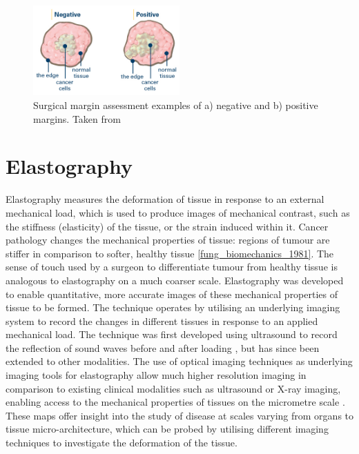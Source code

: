 \begin{figure}[t]
	\centering
    \includegraphics[width=0.5\textwidth]{bground_figs/margins.png}
    \caption{Surgical margin assessment examples of a) negative and b) positive margins. Taken from \cite{breastcancer.org_surgical_2017}}
	    \label{margins}
\end{figure}

\section{Elastography}\label{elastography}
Elastography measures the deformation of tissue in response to an external mechanical load, which is used to produce images of mechanical contrast, such as the stiffness (elasticity) of the tissue, or the strain induced within it. Cancer pathology changes the mechanical properties of tissue: regions of tumour are stiffer in comparison to softer, healthy tissue \ref{fung_biomechanics_1981}. The sense of touch used by a surgeon to differentiate tumour from healthy tissue is analogous to elastography on a much coarser scale. 
Elastography was developed to enable quantitative, more accurate images of these mechanical properties of tissue to be formed. The technique operates by utilising an underlying imaging system to record the changes in different tissues in response to an applied mechanical load. The technique was first developed using ultrasound to record the reflection of sound waves before and after loading \cite{ophir_elastography:_1991}, but has since been extended to other modalities. The use of optical imaging techniques as underlying imaging tools for elastography allow much higher resolution imaging in comparison to existing clinical modalities such as ultrasound or X-ray imaging, enabling access to the mechanical properties of tissues on the micrometre scale \cite{schmitt_oct_1998} \cite{kennedy_review_2014}.
These maps offer insight into the study of disease at scales varying from organs to tissue micro-architecture, which can be probed by utilising different imaging techniques to investigate the deformation of the tissue.

